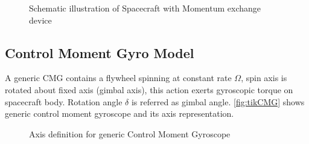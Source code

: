 \begin{figure}[!ht]
    \centering
    
    \caption{Schematic illustration of Spacecraft with Momentum exchange device}
    \label{fig:tikSGCMGFrame}
\end{figure}

\subsection{Control Moment Gyro Model}
A generic CMG contains a flywheel spinning at constant rate $\displaystyle \Omega $, spin axis is rotated about fixed axis (gimbal axis), this action exerts gyroscopic torque on spacecraft body. Rotation angle $\displaystyle \delta $ is referred as gimbal angle. \autoref{fig:tikCMG} shows generic control moment gyroscope and its axis representation.
\begin{figure}[!ht]
    \centering
    
    \caption{Axis definition for generic Control Moment Gyroscope}
    \label{fig:tikCMG}
\end{figure}



